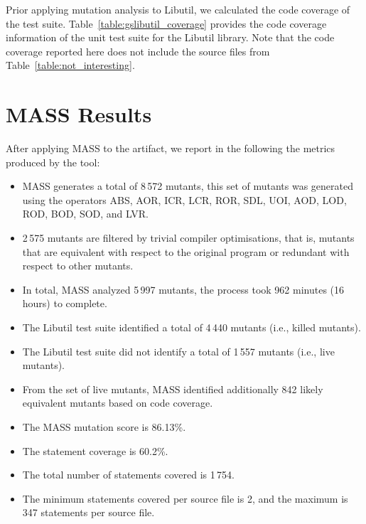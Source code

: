 Prior applying mutation analysis to Libutil, we calculated the code coverage of the test suite. Table~\ref{table:gslibutil_coverage} provides the code coverage information of the unit test suite for the Libutil library. Note that the code coverage reported here does not include the source files from Table~\ref{table:not_interesting}. 




\section{MASS Results}

After applying MASS to the artifact, we report in the following the metrics produced by the tool:

\begin{itemize}
	\item MASS generates a total of 8\,572 mutants, this set of mutants was generated using the operators ABS, AOR, ICR, LCR, ROR, SDL, UOI, AOD, LOD, ROD, BOD, SOD, and LVR.

	\item 2\,575 mutants are filtered by trivial compiler optimisations, that is, mutants that are equivalent with respect to the original program or redundant with respect to other mutants.

	\item In total, MASS analyzed 5\,997 mutants, the process took 962 minutes (16 hours) to complete.

	\item The Libutil test suite identified a total of 4\,440 mutants (i.e., killed mutants).

	\item The Libutil test suite did not identify a total of 1\,557 mutants (i.e., live mutants).

	\item From the set of live mutants, MASS identified additionally 842 likely equivalent mutants based on code coverage.

	\item The MASS mutation score is 86.13\%.

	\item The statement coverage is 60.2\%.
	
	\item The total number of statements covered is 1\,754.
	
	\item The minimum statements covered per source file is 2, and the maximum is 347 statements per source file.
\end{itemize}

